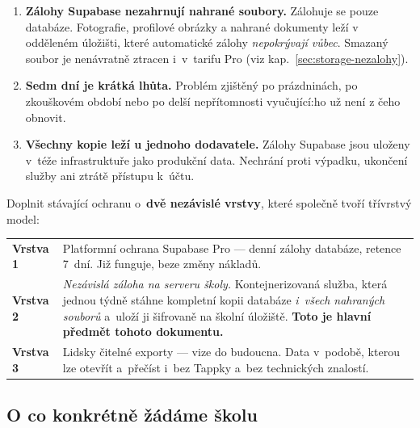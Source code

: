 \documentclass[11pt,a4paper]{article}
\begin{document}
\begin{enumerate}[leftmargin=1.6em]
  \item \textbf{Zálohy Supabase nezahrnují nahrané soubory.} Zálohuje se pouze databáze.
        Fotografie, profilové obrázky a nahrané dokumenty leží v odděleném úložišti, které
        automatické zálohy \emph{nepokrývají vůbec}. Smazaný soubor je nenávratně ztracen
        i~v~tarifu Pro (viz kap.~\ref{sec:storage-nezalohy}).
  \item \textbf{Sedm dní je krátká lhůta.} Problém zjištěný po prázdninách, po zkouškovém období
        nebo po delší nepřítomnosti vyučující:ho už není z čeho obnovit.
  \item \textbf{Všechny kopie leží u jednoho dodavatele.} Zálohy Supabase jsou uloženy v~téže
        infrastruktuře jako produkční data. Nechrání proti výpadku, ukončení služby ani ztrátě
        přístupu k~účtu.
\end{enumerate}

\begin{informace}[Co navrhujeme]
Doplnit stávající ochranu o~\textbf{dvě nezávislé vrstvy}, které společně tvoří třívrstvý model:

\smallskip
\begin{tabularx}{\textwidth}{@{}p{2.6cm}X@{}}
\textbf{Vrstva 1} & Platformní ochrana Supabase Pro --- denní zálohy databáze, retence 7~dní.
                    Již funguje, beze změny nákladů. \\
\textbf{Vrstva 2} & \emph{Nezávislá záloha na serveru školy.} Kontejnerizovaná služba, která
                    jednou týdně stáhne kompletní kopii databáze \emph{i~všech nahraných souborů}
                    a~uloží ji šifrovaně na školní úložiště. \textbf{Toto je hlavní předmět
                    tohoto dokumentu.} \\
\textbf{Vrstva 3} & Lidsky čitelné exporty --- vize do budoucna. Data v~podobě, kterou lze
                    otevřít a~přečíst i~bez Tappky a~bez technických znalostí. \\
\end{tabularx}
\end{informace}

\subsection*{O co konkrétně žádáme školu}
\end{document}

